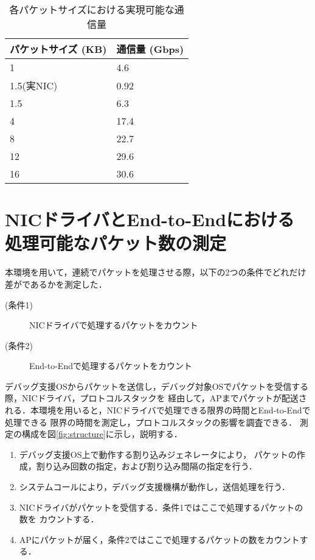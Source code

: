 \documentclass[12pt]{jsarticle}
\begin{document}
\begin{table}[h]
    \caption{各パケットサイズにおける実現可能な通信量}
    \label{throughput-nic}
    \begin{center}
        \begin{tabular}{l|l}   \hline \hline 
            パケットサイズ (KB)      & 通信量 (Gbps)    \\ \hline
            1                        & 4.6            \\
            1.5(実NIC)               & 0.92            \\
            1.5                      & 6.3            \\
            4                        & 17.4            \\
            8                        & 22.7            \\
            12                       & 29.6            \\
            16                       & 30.6            \\ \hline
        \end{tabular}
    \end{center}
\end{table}

\section{NICドライバとEnd-to-Endにおける処理可能なパケット数の測定}
本環境を用いて，連続でパケットを処理させる際，以下の2つの条件でどれだけ差がであるかを測定した．
\begin{description}
    \item[(条件1)] NICドライバで処理するパケットをカウント
    \item[(条件2)] End-to-Endで処理するパケットをカウント
\end{description}
デバッグ支援OSからパケットを送信し，デバッグ対象OSでパケットを受信する際，NICドライバ，プロトコルスタックを
経由して，APまでパケットが配送される．本環境を用いると，NICドライバで処理できる限界の時間とEnd-to-Endで処理できる
限界の時間を測定し，プロトコルスタックの影響を調査できる．
測定の構成を図\ref{fig:structure}に示し，説明する．
\begin{enumerate}
    \item デバッグ支援OS上で動作する割り込みジェネレータにより，
        パケットの作成，割り込み回数の指定，および割り込み間隔の指定を行う．
    \item システムコールにより，デバッグ支援機構が動作し，送信処理を行う．
    \item NICドライバがパケットを受信する．条件1ではここで処理するパケットの数を
        カウントする．
    \item APにパケットが届く，条件2ではここで処理するパケットの数をカウントする．
\end{enumerate}
\end{document}
